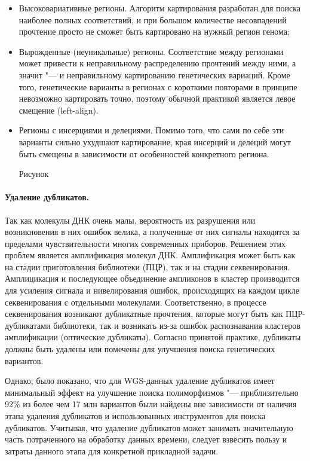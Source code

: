 \documentclass[a4paper,12pt]{article}
\begin{document}
\begin{itemize}
\item Высоковариативные регионы.
Алгоритм картирования разработан для поиска наиболее полных соответствий, и при большом количестве несовпадений прочтение просто не сможет быть картировано на нужный регион генома;
\item Вырожденные (неуникальные) регионы.
Соответствие между регионами может привести к неправильному распределению прочтений между ними, а значит "--- и неправильному картированию генетических вариаций.
Кроме того, генетические варианты в регионах с короткими повторами в принципе невозможно картировать точно, поэтому обычной практикой является левое смещение (left-align).
\item Регионы с инсерциями и делециями.
Помимо того, что сами по себе эти варианты сильно ухудшают картирование, края инсерций и делеций могут быть смещены в зависимости от особенностей конкретного региона.

\begin{Huge}Рисунок\end{Huge}
\end{itemize}

\paragraph{Удаление дубликатов.}
Так как молекулы ДНК очень малы, вероятность их разрушения или возникновения в них ошибок велика, а полученные от них сигналы находятся за пределами чувствительности многих современных приборов.
Решением этих проблем является амплификация молекул ДНК.
Амплификация может быть как на стадии приготовления библиотеки (ПЦР), так и на стадии секвенирования.
Амплицикация и последующее объединение ампликонов в кластер производится для усиления сигнала и нивелирования ошибок, происходящих на каждом цикле секвенирования с отдельными молекулами.
Соответственно, в процессе секвенирования возникают дубликатные прочтения, которые могут быть как ПЦР-дубликатами библиотеки, так и возникать из-за ошибок распознавания кластеров амплификации (оптические дубликаты).
Согласно принятой практике, дубликаты должны быть удалены или помечены для улучшения поиска генетических вариантов\cite{Auwera_2013}.

Однако, было показано, что для WGS-данных удаление дубликатов имеет минимальный эффект на улучшение поиска полиморфизмов "--- приблизительно 92\% из более чем 17 млн вариантов были найдены вне зависимости от наличия этапа удаления дубликатов и использованных инструментов для поиска дубликатов\cite{Ebbert_2016}.
Учитывая, что удаление дубликатов может занимать значительную часть потраченного на обработку данных времени, следует взвесить пользу и затраты данного этапа для конкретной прикладной задачи.
\end{document}
